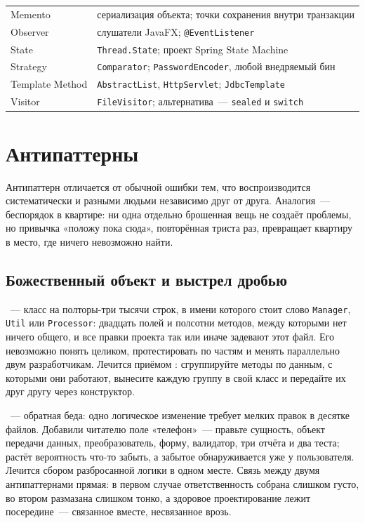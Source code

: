 \begin{longtable}{L{3.4cm}L{11.6cm}}
Memento & сериализация объекта; точки сохранения внутри транзакции \\
Observer & слушатели JavaFX; \texttt{@EventListener} \\
State & \texttt{Thread.State}; проект Spring State Machine \\
Strategy & \texttt{Comparator}; \texttt{PasswordEncoder}, любой внедряемый бин \\
Template Method & \texttt{AbstractList}, \texttt{HttpServlet}; \texttt{JdbcTemplate} \\
Visitor & \texttt{FileVisitor}; альтернатива~--- \texttt{sealed} и \texttt{switch} \\
\end{longtable}

\section{Антипаттерны}

Антипаттерн отличается от обычной ошибки тем, что воспроизводится систематически
и разными людьми независимо друг от друга. Аналогия~--- беспорядок в квартире:
ни одна отдельно брошенная вещь не создаёт проблемы, но привычка «положу пока
сюда», повторённая триста раз, превращает квартиру в место, где ничего
невозможно найти.

\subsection{Божественный объект и выстрел дробью}

~--- класс на полторы-три тысячи строк, в имени которого стоит
слово \texttt{Manager}, \texttt{Util} или \texttt{Processor}: двадцать полей и
полсотни методов, между которыми нет ничего общего, и все правки проекта так или
иначе задевают этот файл. Его невозможно понять целиком, протестировать по
частям и менять параллельно двум разработчикам. Лечится приёмом
: сгруппируйте методы по данным, с которыми они работают,
вынесите каждую группу в свой класс и передайте их друг другу через конструктор.

~--- обратная беда: одно логическое изменение требует
мелких правок в десятке файлов. Добавили читателю поле «телефон»~--- правьте
сущность, объект передачи данных, преобразователь, форму, валидатор, три отчёта
и два теста; растёт вероятность что-то забыть, а забытое обнаруживается уже у
пользователя. Лечится сбором разбросанной логики в одном месте. Связь между
двумя антипаттернами прямая: в первом случае ответственность собрана слишком
густо, во втором размазана слишком тонко, а здоровое проектирование лежит
посередине~--- связанное вместе, несвязанное врозь.

